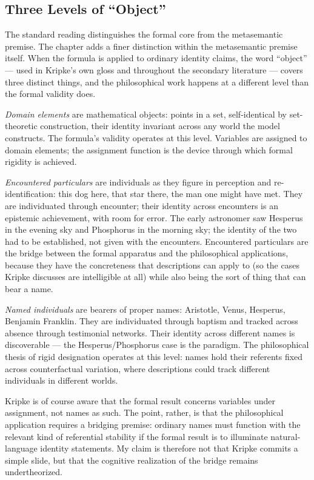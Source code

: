 \documentclass[12pt,a4paper]{article}
\begin{document}
\subsection{Three Levels of ``Object''}\label{three-levels-of-object}

The standard reading distinguishes the formal core from the metasemantic premise. The chapter adds a finer distinction within the metasemantic premise itself. When the formula is applied to ordinary identity claims, the word ``object'' --- used in Kripke's own gloss and throughout the secondary literature --- covers three distinct things, and the philosophical work happens at a different level than the formal validity does.

\emph{Domain elements} are mathematical objects: points in a set, self-identical by set-theoretic construction, their identity invariant across any world the model constructs. The formula's validity operates at this level. Variables are assigned to domain elements; the assignment function is the device through which formal rigidity is achieved.

\emph{Encountered particulars} are individuals as they figure in perception and re-identification: this dog here, that star there, the man one might have met. They are individuated through encounter; their identity across encounters is an epistemic achievement, with room for error. The early astronomer saw Hesperus in the evening sky and Phosphorus in the morning sky; the identity of the two had to be established, not given with the encounters. Encountered particulars are the bridge between the formal apparatus and the philosophical applications, because they have the concreteness that descriptions can apply to (so the cases Kripke discusses are intelligible at all) while also being the sort of thing that can bear a name.

\emph{Named individuals} are bearers of proper names: Aristotle, Venus, Hesperus, Benjamin Franklin. They are individuated through baptism and tracked across absence through testimonial networks. Their identity across different names is discoverable --- the Hesperus/Phosphorus case is the paradigm. The philosophical thesis of rigid designation operates at this level: names hold their referents fixed across counterfactual variation, where descriptions could track different individuals in different worlds.

Kripke is of course aware that the formal result concerns variables under assignment, not names as such. The point, rather, is that the philosophical application requires a bridging premise: ordinary names must function with the relevant kind of referential stability if the formal result is to illuminate natural-language identity statements. My claim is therefore not that Kripke commits a simple slide, but that the cognitive realization of the bridge remains undertheorized.
\end{document}
